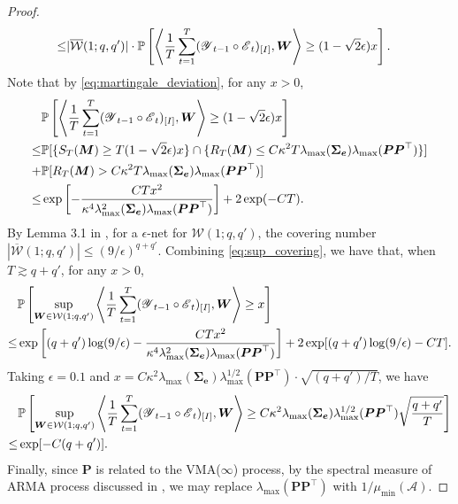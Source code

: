\documentclass[12pt]{article}
\newcommand{\bm}{\boldsymbol}
\newcommand{\cm}[1]{\mbox{\boldmath$\mathscr{#1}$}}
\begin{document}
\begin{proof}
\begin{equation}
\begin{split}
	\leq&|\overline{\mathcal{W}}(1;q,q')|\cdot\mathbb{P}\left[\left\langle\frac{1}{T}\sum_{t=1}^T(\cm{Y}_{t-1}\circ\cm{E}_t)_{[I]},\bm{W}\right\rangle\geq (1-\sqrt{2}\epsilon)x\right].
	\end{split}
	\end{equation}
	Note that by \eqref{eq:martingale_deviation}, for any $x>0$,
	\begin{equation}
	\begin{split}
	&\mathbb{P}\left[\left\langle\frac{1}{T}\sum_{t=1}^T(\cm{Y}_{t-1}\circ\cm{E}_t)_{[I]},\bm{W}\right\rangle\geq (1-\sqrt{2}\epsilon)x\right]\\
	\leq&\mathbb{P}[\{S_T(\bm{M})\geq T(1-\sqrt{2}\epsilon)x\}\cap\{R_T(\bm{M})\leq C\kappa^2 T\lambda_{\max}(\bm{\Sigma_e})\lambda_{\max}(\bm{P}\bm{P}^\top)\}]\\
	+&\mathbb{P}[R_T(\bm{M})>C\kappa^2T\lambda_{\max}(\bm{\Sigma_e})\lambda_{\max}(\bm{P}\bm{P}^\top)]\\
	\leq&\exp\left[-\frac{CTx^2}{\kappa^4\lambda_{\max}^2(\bm{\Sigma}_{\bm{e}})\lambda_{\max}(\bm{P}\bm{P}^\top)}\right]+2\exp(-CT).
	\end{split}
	\end{equation}
	By Lemma 3.1 in \citet{candes2011tight}, for a $\epsilon$-net for $\mathcal{W}(1;q,q')$, the covering number $|\overline{\mathcal{W}}(1;q,q')|\leq(9/\epsilon)^{q+q'}$. Combining \eqref{eq:sup_covering}, we have that, when $T\gtrsim q+q'$, for any $x>0$,
	\begin{equation}
	\begin{split}
	&\mathbb{P}\left[\sup_{\bm{W}\in\mathcal{W}(1;q,q')}\left\langle\frac{1}{T}\sum_{t=1}^T(\cm{Y}_{t-1}\circ\cm{E}_t)_{[I]},\bm{W}\right\rangle\geq x\right]\\
	\leq&\exp\left[(q+q')\log(9/\epsilon)-\frac{CTx^2}{\kappa^4\lambda_{\max}^2(\bm{\Sigma}_{\bm{e}})\lambda_{\max}(\bm{P}\bm{P}^\top)}\right]+2\exp[(q+q')\log(9/\epsilon)-CT].
	\end{split}
	\end{equation}
	Taking $\epsilon=0.1$ and $x=C\kappa^2\lambda_{\max}(\bm{\Sigma}_{\bm{e}})\lambda_{\max}^{1/2}(\bm{P}\bm{P}^\top)\cdot\sqrt{(q+q')/T}$, we have
	\begin{equation}\begin{split}
	&\mathbb{P}\left[\sup_{\bm{W}\in\mathcal{W}(1;q,q')}\left\langle\frac{1}{T}\sum_{t=1}^T(\cm{Y}_{t-1}\circ\cm{E}_t)_{[I]},\bm{W}\right\rangle\geq C\kappa^2\lambda_{\max}(\bm{\Sigma_e})\lambda_{\max}^{1/2}(\bm{P}\bm{P}^\top)\sqrt{\frac{q+q'}{T}}\right]\\
	\leq&\exp[-C(q+q')].
	\end{split}\end{equation}	
	Finally, since $\bm{P}$ is related to the VMA($\infty$) process, by the spectral measure of ARMA process discussed in \citet{basu2015regularized}, we may replace $\lambda_{\max}(\bm{P}\bm{P}^\top)$ with $1/\mu_{\min}(\mathcal{A})$.
\end{proof}
\end{document}
